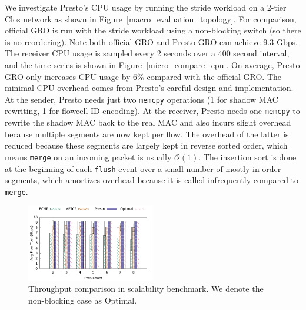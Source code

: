 We investigate Presto's CPU usage by
running the stride workload on a 2-tier Clos network as shown in Figure~\ref{macro_evaluation_topology}. 
For comparison, official GRO is run with the stride workload using a non-blocking switch (so there
is no reordering). Note both official GRO and Presto GRO can achieve 9.3 Gbps.  
The receiver CPU usage is sampled every 2 seconds over a 400 second interval, and
the time-series is shown in Figure~\ref{micro_compare_cpu}. 
On average, Presto GRO only increases CPU usage by 6\% compared with the official GRO. 
The minimal CPU overhead comes from Presto's careful design and implementation. 
At the sender, Presto needs just two {\tt memcpy} operations (1 for shadow MAC rewriting, 1 for flowcell ID encoding). 
At the receiver, Presto needs one {\tt memcpy} to rewrite the shadow MAC back to the real MAC and
also incurs slight overhead because multiple segments are now kept per flow. The overhead
of the latter is reduced because these segments are largely kept in reverse sorted order, which means {\tt merge}
on an incoming packet is usually $\mathcal{O}(1)$. The insertion sort is done at the beginning of each {\tt flush} event over a small
number of mostly in-order segments, which amortizes overhead because it is called infrequently compared to {\tt merge}.

\begin{figure}[!t]
        \centering
  \includegraphics[width=0.5\textwidth]{presto/figures/scalability_test/scalability_compare_tput_witherrbar.pdf}
        \caption{Throughput comparison in scalability benchmark. We denote the non-blocking case as Optimal. 
		} 
        \label{micro_scalability_test_tput}
\end{figure}

